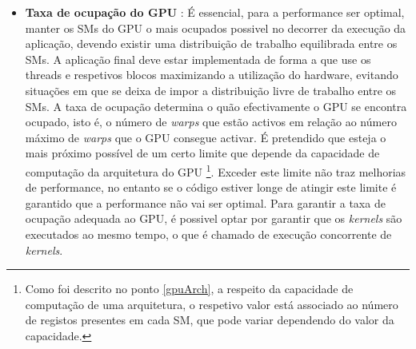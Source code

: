 \begin{itemize}
\item{\textbf{Taxa de ocupação do GPU}} :
É essencial, para a performance ser optimal, manter os SMs do GPU o mais ocupados possivel no decorrer da execução da aplicação, devendo existir uma distribuição de trabalho equilibrada entre os SMs. A aplicação final deve estar implementada de forma a que use os threads e respetivos blocos maximizando a utilização do hardware, evitando situações em que se deixa de impor a distribuição livre de trabalho entre os SMs.
A taxa de ocupação determina o quão efectivamente o GPU se encontra ocupado, isto é, o número de \textit{warps} que estão activos em relação ao número máximo de \textit{warps} que o GPU consegue activar. É pretendido que esteja o mais próximo possível de um certo limite que depende da capacidade de computação da arquitetura do GPU \footnote[3]{Como foi descrito no ponto \ref{gpuArch}, a respeito da capacidade de computação de uma arquitetura, o respetivo valor está associado ao número de registos presentes em cada SM, que pode variar dependendo do valor da capacidade.}. Exceder este limite não traz melhorias de performance, no entanto se o código estiver longe de atingir este limite é garantido que a performance não vai ser optimal. Para garantir a taxa de ocupação adequada ao GPU, é possivel optar por garantir que os \textit{kernels} são executados ao mesmo tempo, o que é chamado de execução concorrente de \textit{kernels}. 


\end{itemize}
